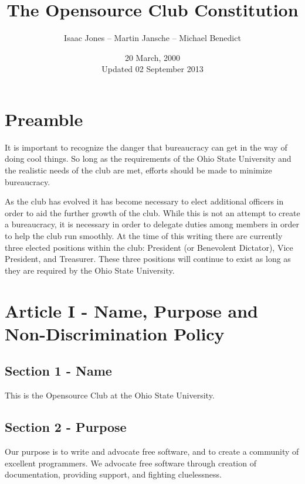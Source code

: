 \documentclass{article}
\title{The Opensource Club Constitution}
\author{Isaac Jones -- Martin Jansche -- Michael Benedict}
\date{20 March, 2000\\ Updated 02 September 2013}
\begin{document}
	\maketitle

	\section{Preamble}


	It is important to recognize the danger that bureaucracy can get in the way of doing cool things.  So long as the requirements of the Ohio State University and the realistic needs of the club are met, efforts should be made to minimize bureaucracy.

	As the club has evolved it has become necessary to elect additional officers in order to aid the further growth of the club. While this is not an attempt to create a bureaucracy, it is necessary in order to delegate duties among members in order to help the club run smoothly. At the time of this writing there are currently three elected positions within the club: President (or Benevolent Dictator), Vice President, and Treasurer. These three positions will continue to exist as long as they are required by the Ohio State University.

	\section{Article I - Name, Purpose and Non-Discrimination Policy}

	\subsection{Section 1 - Name}

	This is the Opensource Club at the Ohio State University.

	\subsection{Section 2 - Purpose}

	Our purpose is to write and advocate free software, and to create a community of excellent programmers. We advocate free software through creation of documentation, providing support, and fighting cluelessness.
\end{document}
